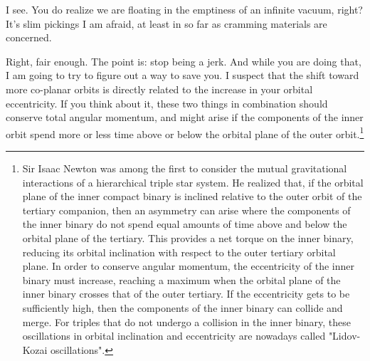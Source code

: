 \documentclass[main.tex]{subfiles}
\begin{document}
\par \Alcyone I see.  You do realize we are floating in the emptiness of an infinite vacuum, right?  It's slim pickings I am afraid, at least in so far as cramming materials are concerned.

\par \Celaeno Right, fair enough.  The point is:  stop being a jerk.  And while you are doing that, I am going to try to figure out a way to save you.  I suspect that the shift toward more co-planar orbits is directly related to the increase in your orbital eccentricity.  If you think about it, these two things in combination should conserve total angular momentum, and might arise if the components of the inner orbit spend more or less time above or below the orbital plane of the outer orbit.\footnote{Sir Isaac Newton was among the first to consider the mutual gravitational interactions of a hierarchical triple star system.  He realized that, if the orbital plane of the inner compact binary is inclined relative to the outer orbit of the tertiary companion, then an asymmetry can arise where the components of the inner binary do not spend equal amounts of time above and below the orbital plane of the tertiary.  This provides a net torque on the inner binary, reducing its orbital inclination with respect to the outer tertiary orbital plane.  In order to conserve angular momentum, the eccentricity of the inner binary must increase, reaching a maximum when the orbital plane of the inner binary crosses that of the outer tertiary.  If the eccentricity gets to be sufficiently high, then the components of the inner binary can collide and merge.  For triples that do not undergo a collision in the inner binary, these oscillations in orbital inclination and eccentricity are nowadays called "Lidov-Kozai oscillations".} 

\end{document}
